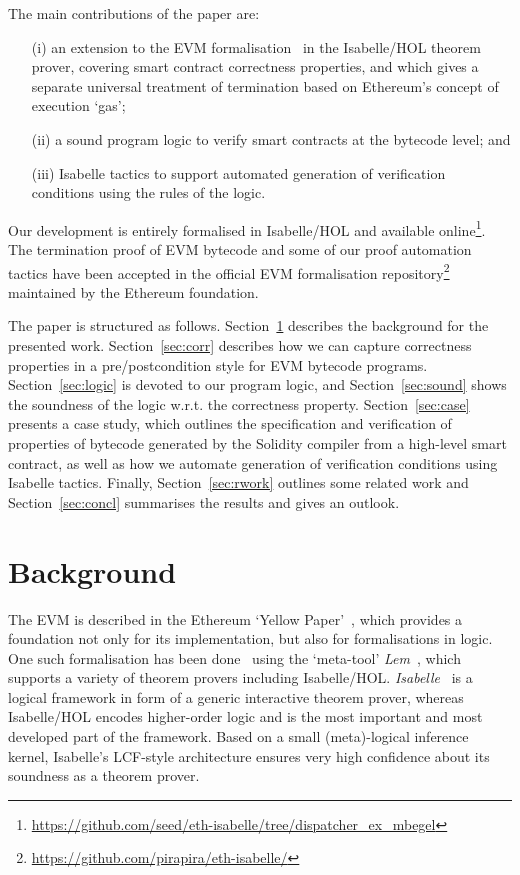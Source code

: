 \documentclass[sigplan,10pt]{acmart}\settopmatter{printfolios=true,printccs=false,printacmref=false}
\begin{document}
The main contributions of the paper are:
\begin{itemize}
\item[(i)] an extension to the EVM formalisation~\cite{Yoichi} in the Isabelle/HOL theorem prover,
           covering smart contract correctness properties, and which gives a separate universal
           treatment of termination based on Ethereum's concept of execution `gas';
\item[(ii)] a sound program logic to verify smart contracts at the bytecode level; and
\item[(iii)] Isabelle tactics to support automated generation of verification
            conditions using the rules of the logic.
\end{itemize}

Our development is entirely formalised in Isabelle/HOL and available online\footnote{\url{https://github.com/seed/eth-isabelle/tree/dispatcher_ex_mbegel}}.
The termination proof of EVM bytecode and some of our proof
automation tactics have been accepted in the official EVM
formalisation repository\footnote{\url{https://github.com/pirapira/eth-isabelle/}} maintained by the Ethereum foundation.

The paper is structured as follows. Section~\ref{sec:bg} describes the background
for the presented work. Section~\ref{sec:corr} describes how we can capture correctness properties in a pre/postcondition
style for EVM bytecode programs. Section~\ref{sec:logic} is devoted to our program logic, 
and Section~\ref{sec:sound} shows the soundness of the logic
w.r.t. the correctness property.
Section~\ref{sec:case} presents a case study, which outlines the 
specification and verification of properties of bytecode 
generated by the Solidity compiler from a high-level smart contract, 
as well as how we automate generation of verification conditions using Isabelle tactics.
Finally, Section~\ref{sec:rwork} outlines some related work and
Section~\ref{sec:concl} summarises the results and gives an outlook.
%
\section{Background} 
\label{sec:bg}
The EVM is described in the Ethereum `Yellow Paper'~\cite{wood2014ethereum},
which provides a %
foundation not only for its implementation, but also for formalisations in logic.
One such formalisation has been done~\cite{Yoichi} using the `meta-tool' \emph{Lem}~\cite{DBLP:conf/icfp/MulliganOGRS14},
which supports a variety of theorem provers including Isabelle/HOL.
\emph{Isabelle}~\cite{Nipkow_PW:Isabelle} is a logical framework in form of a generic interactive theorem prover, whereas
Isabelle/HOL encodes higher-order logic and is the most important and most developed part of the framework.
Based on a small (meta)-logical inference kernel, Isabelle's LCF-style architecture
ensures very high confidence about its soundness as a theorem prover.
 
\end{document}
